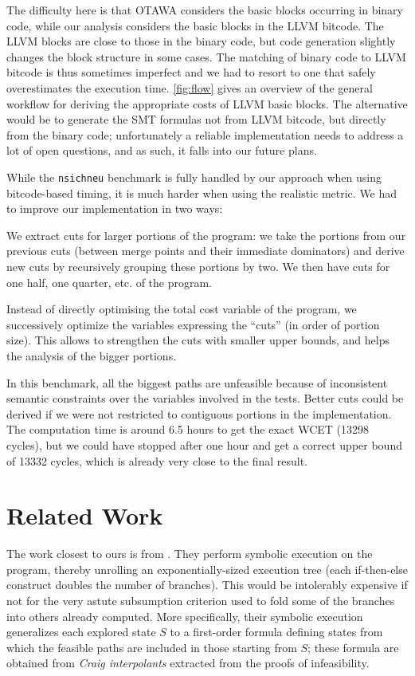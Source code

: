 \documentclass[a4paper,twocolumn,11pt]{article}
\begin{document}
The difficulty here is that OTAWA considers the basic blocks occurring in binary code, while our analysis considers the basic blocks in the LLVM bitcode. 
The LLVM blocks are close to those in the binary code, but code generation slightly changes the block structure in some cases. The matching of binary code to LLVM bitcode is thus sometimes imperfect and we had to resort to one that safely overestimates the execution time. \autoref{fig:flow} gives an overview of the general workflow for deriving the appropriate costs of LLVM basic blocks.
The alternative would be to generate the SMT formulas not from LLVM bitcode, but directly from the binary code; unfortunately a reliable implementation needs to address a lot of open questions, and as such, it falls into our future plans.


While the \texttt{nsichneu} benchmark is fully handled by our approach when using bitcode-based timing, it is much harder when using the realistic metric. We had to improve our implementation in two ways:
\begin{enumerate*}
	\item We extract cuts for larger portions of the program: we take the portions from our previous cuts (between merge points and their immediate dominators) and derive new cuts by recursively grouping these portions by two. We then have cuts for one half, one quarter, etc. of the program.
	\item Instead of directly optimising the total cost variable of the program, we successively optimize the variables expressing the ``cuts'' (in order of portion size). This allows to strengthen the cuts with smaller upper bounds, and helps the analysis of the bigger portions.
\end{enumerate*}
In this benchmark, all the biggest paths are unfeasible because of inconsistent semantic constraints over the variables involved in the tests. Better cuts could be derived if we were not restricted to contiguous portions in the implementation. The computation time is around 6.5 hours to get the exact WCET (13298 cycles), but we could have stopped after one hour and get a correct upper bound of 13332 cycles, which is already very close to the final result.

\section{Related Work}
\label{sec:related}

The work closest to ours is from \textcite{Chu_Jaffar_EMSOFT2011}.
They perform symbolic execution on the program, thereby unrolling an exponentially-sized execution tree (each if-then-else construct doubles the number of branches).
This would be intolerably expensive if not for the very astute subsumption criterion used to fold some of the branches into others already computed.
More specifically, their symbolic execution generalizes each explored state $S$ to a first-order formula defining states from which the feasible paths are included in those starting from $S$;
these formula are obtained from \emph{Craig interpolants} extracted from the proofs of infeasibility.
\end{document}
